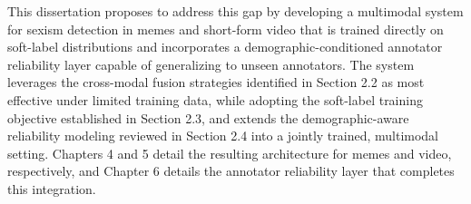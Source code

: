 This dissertation proposes to address this gap by developing a multimodal system for
sexism detection in memes and short-form video that is trained directly on soft-label
distributions and incorporates a demographic-conditioned annotator reliability layer
capable of generalizing to unseen annotators. The system leverages the cross-modal
fusion strategies identified in Section 2.2 as most effective under limited training data,
while adopting the soft-label training objective established in Section 2.3, and extends
the demographic-aware reliability modeling reviewed in Section 2.4 into a jointly trained,
multimodal setting. Chapters 4 and 5 detail the resulting architecture for memes and
video, respectively, and Chapter 6 details the annotator reliability layer that completes
this integration.